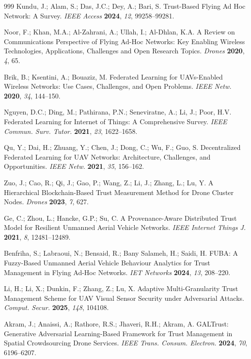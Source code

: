 \documentclass[notspecified,article,submit,moreauthors]{Definitions/mdpi}
\begin{document}
\begin{thebibliography}{999}
Kundu, J.; Alam, S.; Das, J.C.; Dey, A.; Bari, S. Trust-Based Flying Ad Hoc Network: A Survey. {\em IEEE Access} {\bf 2024}, {\em 12}, 99258--99281.

Noor, F.; Khan, M.A.; Al-Zahrani, A.; Ullah, I.; Al-Dhlan, K.A. A Review on Communications Perspective of Flying Ad-Hoc Networks: Key Enabling Wireless Technologies, Applications, Challenges and Open Research Topics. {\em Drones} {\bf 2020}, {\em 4}, 65.

Brik, B.; Ksentini, A.; Bouaziz, M. Federated Learning for UAVs-Enabled Wireless Networks: Use Cases, Challenges, and Open Problems. {\em IEEE Netw.} {\bf 2020}, {\em 34}, 144--150.

Nguyen, D.C.; Ding, M.; Pathirana, P.N.; Seneviratne, A.; Li, J.; Poor, H.V. Federated Learning for Internet of Things: A Comprehensive Survey. {\em IEEE Commun. Surv. Tutor.} {\bf 2021}, {\em 23}, 1622--1658.

Qu, Y.; Dai, H.; Zhuang, Y.; Chen, J.; Dong, C.; Wu, F.; Guo, S. Decentralized Federated Learning for UAV Networks: Architecture, Challenges, and Opportunities. {\em IEEE Netw.} {\bf 2021}, {\em 35}, 156--162.

Zuo, J.; Cao, R.; Qi, J.; Gao, P.; Wang, Z.; Li, J.; Zhang, L.; Lu, Y. A Hierarchical Blockchain-Based Trust Measurement Method for Drone Cluster Nodes. {\em Drones} {\bf 2023}, {\em 7}, 627.

Ge, C.; Zhou, L.; Hancke, G.P.; Su, C. A Provenance-Aware Distributed Trust Model for Resilient Unmanned Aerial Vehicle Networks. {\em IEEE Internet Things J.} {\bf 2021}, {\em 8}, 12481--12489.

Benfriha, S.; Labraoui, N.; Bensaid, R.; Bany Salameh, H.; Saidi, H. FUBA: A Fuzzy-Based Unmanned Aerial Vehicle Behaviour Analytics for Trust Management in Flying Ad-Hoc Networks. {\em IET Networks} {\bf 2024}, {\em 13}, 208--220.

Li, H.; Li, X.; Dunkin, F.; Zhang, Z.; Lu, X. Adaptive Multi-Granularity Trust Management Scheme for UAV Visual Sensor Security under Adversarial Attacks. {\em Comput. Secur.} {\bf 2025}, {\em 148}, 104108.

Akram, J.; Anaissi, A.; Rathore, R.S.; Jhaveri, R.H.; Akram, A. GALTrust: Generative Adversarial Learning-Based Framework for Trust Management in Spatial Crowdsourcing Drone Services. {\em IEEE Trans. Consum. Electron.} {\bf 2024}, {\em 70}, 6196--6207.


\end{thebibliography}
\end{document}
